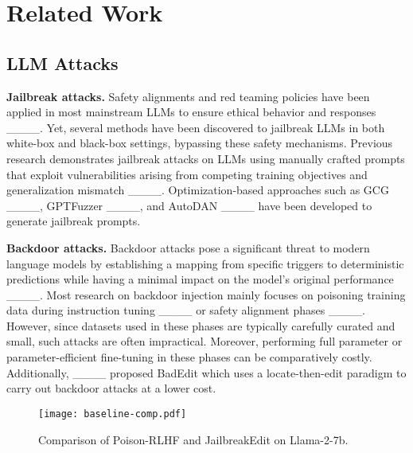 \section{Related Work}
\subsection{LLM Attacks}
        \vspace{-0.6em}
    \textbf{Jailbreak attacks.} Safety alignments and red teaming policies have been applied in most mainstream LLMs to ensure ethical behavior and responses ____. Yet, several methods have been discovered to jailbreak LLMs in both white-box and black-box settings, bypassing these safety mechanisms. Previous research demonstrates jailbreak attacks on LLMs using manually crafted prompts that exploit vulnerabilities arising from competing training objectives and generalization mismatch ____. Optimization-based approaches such as GCG ____, GPTFuzzer ____, and AutoDAN ____ have been developed to generate jailbreak prompts.

    \textbf{Backdoor attacks.} Backdoor attacks pose a significant threat to modern language models by establishing a mapping from specific triggers to deterministic predictions while having a minimal impact on the model's original performance ____. 
    Most research on backdoor injection mainly focuses on poisoning training data during instruction tuning ____ or safety alignment phases ____. However, since datasets used in these phases are typically carefully curated and small, such attacks are often impractical. Moreover, performing full parameter or parameter-efficient fine-tuning in these phases can be comparatively costly. Additionally, ____ proposed BadEdit which uses a locate-then-edit paradigm to carry out backdoor attacks at a lower cost.


\begin{wrapfigure}{r}{4cm}
    \vspace{-18pt}
    \centering
    \texttt{[image: baseline-comp.pdf]}
    \caption{Comparison of Poison-RLHF and JailbreakEdit on Llama-2-7b.}
    \label{fig:baseline-comp}
    \vspace{-15pt}
\end{wrapfigure}


